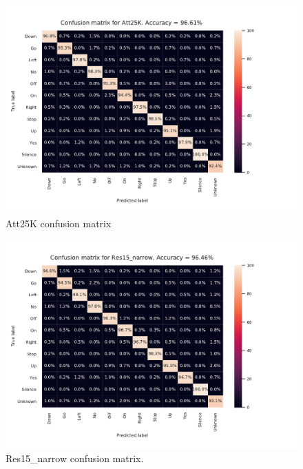 
\begin{figure}[htbp]
\centerline{\includegraphics[scale=.5]{conf_att.pdf}}
\caption{Att25K confusion matrix}
\label{conf_att}
\end{figure}

\begin{figure}[htbp]
\centerline{\includegraphics[scale=.5]{conf_res.pdf}}
\caption{Res15_narrow confusion matrix.}
\label{conf_res}
\end{figure}


